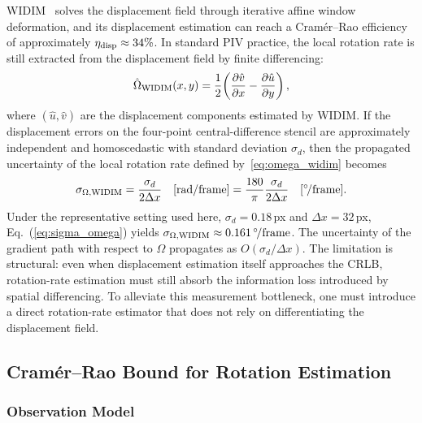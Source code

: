 \documentclass[lettersize,journal]{IEEEtran}
\begin{document}
WIDIM~\cite{Scarano2000} solves the displacement field through iterative affine window deformation,
and its displacement estimation can reach a Cram\'{e}r--Rao efficiency of approximately $\eta_{\rm disp} \approx 34\%$.
In standard PIV practice, the local rotation rate is still extracted from the displacement field by finite differencing:
%
\begin{equation}
  \hat{\Omega}_{\rm WIDIM}(x,y)
  = \frac{1}{2}\!\left(\frac{\partial \hat{v}}{\partial x}
    - \frac{\partial \hat{u}}{\partial y}\right),
  \label{eq:omega_widim}
\end{equation}
%
where $(\hat{u}, \hat{v})$ are the displacement components estimated by WIDIM.
If the displacement errors on the four-point central-difference stencil are approximately independent and homoscedastic with standard deviation $\sigma_d$,
then the propagated uncertainty of the local rotation rate defined by~\eqref{eq:omega_widim} becomes
%
\begin{equation}
  \sigma_{\Omega,\rm WIDIM}
  = \frac{\sigma_d}{2\Delta x}\quad [\mathrm{rad/frame}]
  = \frac{180}{\pi}\frac{\sigma_d}{2\Delta x}\quad [^\circ\!/\mathrm{frame}].
  \label{eq:sigma_omega}
\end{equation}
%
Under the representative setting used here,
$\sigma_d=0.18\,$px and $\Delta x=32\,$px,
Eq.~(\ref{eq:sigma_omega}) yields
$\sigma_{\Omega,\rm WIDIM}\approx 0.161\,^\circ\!/\mathrm{frame}$.
The uncertainty of the gradient path with respect to $\Omega$ propagates as $O(\sigma_d/\Delta x)$.
The limitation is structural:
even when displacement estimation itself approaches the CRLB,
rotation-rate estimation must still absorb the information loss introduced by spatial differencing.
To alleviate this measurement bottleneck, one must introduce a direct rotation-rate estimator that does not rely on differentiating the displacement field.

\subsection{Cram\'{e}r--Rao Bound for Rotation Estimation}
\label{sec:crlb_rotation}

\subsubsection{Observation Model}
\end{document}
